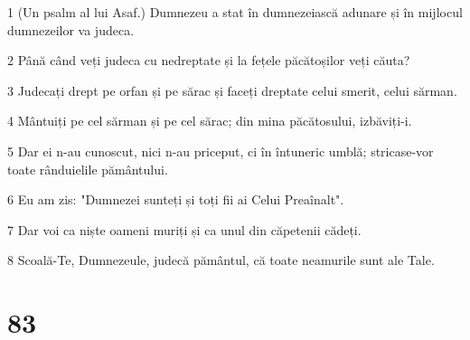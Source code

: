 \par 1 (Un psalm al lui Asaf.) Dumnezeu a stat în dumnezeiască adunare și în mijlocul dumnezeilor va judeca.
\par 2 Până când veți judeca cu nedreptate și la fețele păcătoșilor veți căuta?
\par 3 Judecați drept pe orfan și pe sărac și faceți dreptate celui smerit, celui sărman.
\par 4 Mântuiți pe cel sărman și pe cel sărac; din mina păcătosului, izbăviți-i.
\par 5 Dar ei n-au cunoscut, nici n-au priceput, ci în întuneric umblă; stricase-vor toate rânduielile pământului.
\par 6 Eu am zis: "Dumnezei sunteți și toți fii ai Celui Preaînalt".
\par 7 Dar voi ca niște oameni muriți și ca unul din căpetenii cădeți.
\par 8 Scoală-Te, Dumnezeule, judecă pământul, că toate neamurile sunt ale Tale.

\chapter{83}

